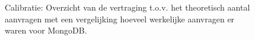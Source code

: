 \begin{figure}[h!] 
	\centering
	\caption{Calibratie: Overzicht van de vertraging t.o.v. het theoretisch aantal aanvragen met een vergelijking hoeveel werkelijke aanvragen er waren voor MongoDB. }
	\label{fig:calibratie-queriesperseconde-mongodb}
\end{figure}

